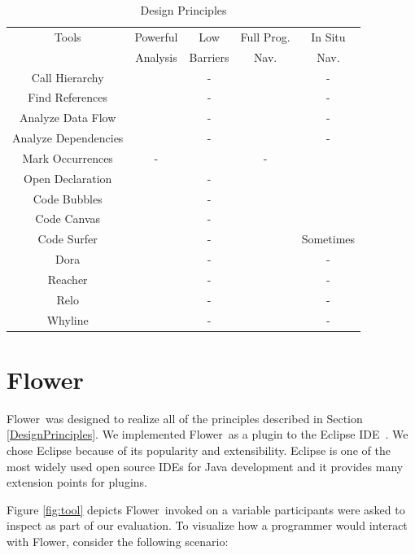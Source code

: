\documentclass[conference]{IEEEtran}
\newcommand{\toolName}{Flower}
\begin{document}
\begin{table}
	\centering
	\caption{Design Principles}
	\begin{tabular}{|c|c|c|c|c|}
		\rowcolor{Gray}
		\hline
		Tools & Powerful & Low & Full Prog. & In Situ\\
		\rowcolor{Gray}
		 & Analysis & Barriers & Nav. & Nav.\\
		\hline
		Call Hierarchy & \checkmark & - & \checkmark & -\\
		\rowcolor{Gray}
		Find References & \checkmark & - & \checkmark & -\\
		Analyze Data Flow & \checkmark & - & \checkmark & -\\
		\rowcolor{Gray}
		Analyze Dependencies & \checkmark & - & \checkmark & -\\
		Mark Occurrences & - & \checkmark & - & \checkmark \\
		\rowcolor{Gray}
		Open Declaration & \checkmark & - & \checkmark & \checkmark \\
		Code Bubbles & \checkmark & - & \checkmark & \checkmark \\
		\rowcolor{Gray}
		Code Canvas & \checkmark & - & \checkmark & \checkmark \\
		Code Surfer & \checkmark & - & \checkmark & Sometimes \\
		\rowcolor{Gray}
		Dora & \checkmark & - & \checkmark & - \\
		Reacher & \checkmark & - & \checkmark & - \\
		\rowcolor{Gray}
		Relo & \checkmark & - & \checkmark & - \\
		Whyline & \checkmark & - & \checkmark & - \\
		\hline
	\end{tabular}
	\label{table:background}
\end{table}


\section{\toolName}
\toolName~was designed to realize all of the principles described in Section \ref{DesignPrinciples}. 
We implemented \toolName~as a plugin to the Eclipse IDE~\cite{Eclipse}. 
We chose Eclipse because of its popularity and extensibility. 
Eclipse is one of the most widely used open source IDEs for Java development and it provides many extension points for plugins. 

Figure \ref{fig:tool} depicts \toolName~invoked on a variable participants were asked to inspect as part of our evaluation. To visualize how a programmer would interact with \toolName, consider the following scenario:
\end{document}
